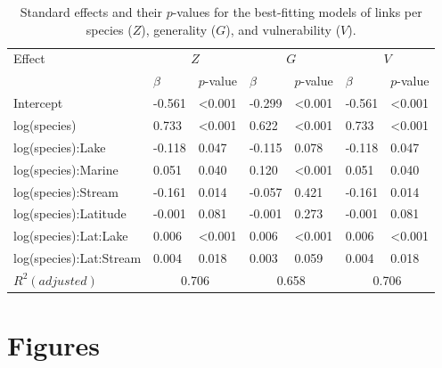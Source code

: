 \documentclass[12pt]{article}
\begin{document}
\begin{table}[!h]

\caption{Standard effects and their $p$-values for the best-fitting models of links per species ($Z$), generality ($G$), and vulnerability ($V$).}
\label{Bestfits}
\begin{tabular}{l | l l | l l | l l }
Effect          & \multicolumn{2}{c|}{$Z$} & \multicolumn{2}{c|}{$G$} & \multicolumn{2}{c}{$V$}\\
                & $\beta$ & $p$-value     &  $\beta$ & $p$-value    &  $\beta$ & $p$-value  \\
\hline
Intercept               & -0.561 & \textless0.001 & -0.299 & \textless0.001 & -0.561 & \textless0.001 \\
log(species)            &  0.733 & \textless0.001 &  0.622 & \textless0.001 &  0.733 & \textless0.001 \\
log(species):Lake       & -0.118 & 0.047          & -0.115 & 0.078          & -0.118 & 0.047 \\
log(species):Marine     &  0.051 & 0.040          &  0.120 & \textless0.001 &  0.051 & 0.040 \\
log(species):Stream     & -0.161 & 0.014          & -0.057 & 0.421          & -0.161 & 0.014 \\
log(species):Latitude   & -0.001 & 0.081          & -0.001 & 0.273          & -0.001 & 0.081 \\
log(species):Lat:Lake   &  0.006 & \textless0.001 &  0.006 & \textless0.001 &  0.006 & \textless0.001 \\
log(species):Lat:Stream &  0.004 & 0.018          &  0.003 & 0.059          &  0.004 & 0.018 \\
\hline
$R^{2} (adjusted)$   & \multicolumn{2}{c|}{0.706} & \multicolumn{2}{c|}{0.658} & \multicolumn{2}{c}{0.706} \\
\end{tabular}
\end{table}

\newpage

\section*{Figures}
\end{document}

